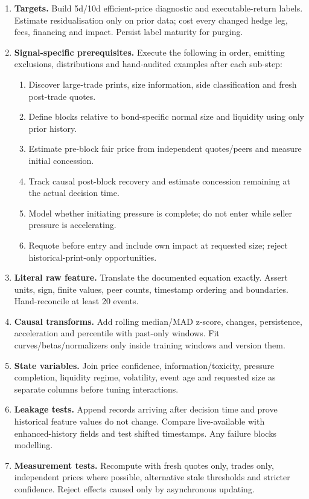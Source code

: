 \documentclass[10pt]{article}
\begin{document}
\begin{enumerate}[leftmargin=2em,label=\textbf{A\arabic*.}]
\item \textbf{Targets.} Build 5d/10d efficient-price diagnostic and executable-return labels. Estimate residualisation only on prior data; cost every changed hedge leg, fees, financing and impact. Persist label maturity for purging.
\item \textbf{Signal-specific prerequisites.} Execute the following in order, emitting exclusions, distributions and hand-audited examples after each sub-step:
\begin{enumerate}[label=\alph*)]
\item Discover large-trade prints, size information, side classification and fresh post-trade quotes.
\item Define blocks relative to bond-specific normal size and liquidity using only prior history.
\item Estimate pre-block fair price from independent quotes/peers and measure initial concession.
\item Track causal post-block recovery and estimate concession remaining at the actual decision time.
\item Model whether initiating pressure is complete; do not enter while seller pressure is accelerating.
\item Requote before entry and include own impact at requested size; reject historical-print-only opportunities.
\end{enumerate}
\item \textbf{Literal raw feature.} Translate the documented equation exactly. Assert units, sign, finite values, peer counts, timestamp ordering and boundaries. Hand-reconcile at least 20 events.
\item \textbf{Causal transforms.} Add rolling median/MAD z-score, changes, persistence, acceleration and percentile with past-only windows. Fit curves/betas/normalizers only inside training windows and version them.
\item \textbf{State variables.} Join price confidence, information/toxicity, pressure completion, liquidity regime, volatility, event age and requested size as separate columns before tuning interactions.
\item \textbf{Leakage tests.} Append records arriving after decision time and prove historical feature values do not change. Compare live-available with enhanced-history fields and test shifted timestamps. Any failure blocks modelling.
\item \textbf{Measurement tests.} Recompute with fresh quotes only, trades only, independent prices where possible, alternative stale thresholds and stricter confidence. Reject effects caused only by asynchronous updating.

\end{enumerate}
\end{document}
